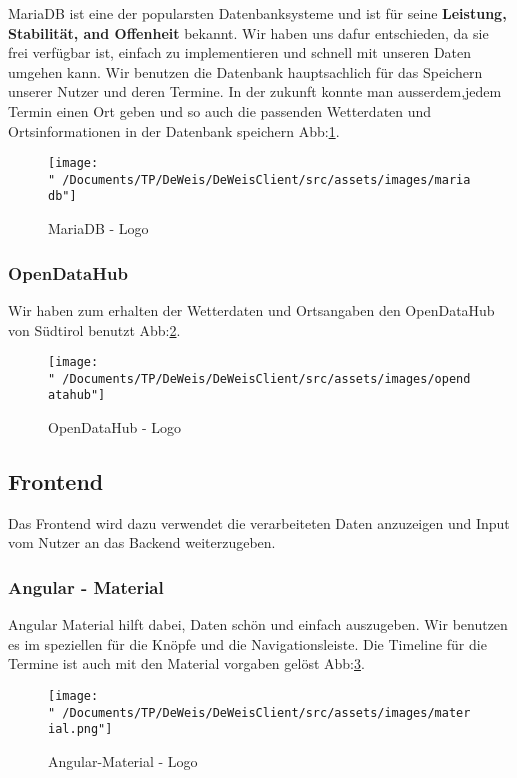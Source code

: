 \documentclass{scrartcl}
\begin{document}
    MariaDB ist eine der popularsten Datenbanksysteme und ist für seine \textbf{Leistung, Stabilität, and Offenheit} bekannt.
    Wir haben uns dafur entschieden, da sie frei verfügbar ist, einfach zu implementieren und schnell mit unseren Daten umgehen kann.
    Wir benutzen die Datenbank hauptsachlich für das Speichern unserer Nutzer und deren Termine. In der zukunft konnte man ausserdem,jedem 
    Termin einen Ort geben und so auch die passenden Wetterdaten und Ortsinformationen in der Datenbank speichern Abb:\ref{fig:maria}.
    \begin{figure}[h]
    \centering
    \texttt{[image: "~/Documents/TP/DeWeis/DeWeisClient/src/assets/images/mariadb"]}
    \caption{MariaDB - Logo}
    \label{fig:maria}
    \end{figure}


    \subsubsection{OpenDataHub}

    Wir haben zum erhalten der Wetterdaten und Ortsangaben den OpenDataHub von Südtirol benutzt Abb:\ref{fig:open}.
    \begin{figure}[h]
    \centering
    \texttt{[image: "~/Documents/TP/DeWeis/DeWeisClient/src/assets/images/opendatahub"]}
    \caption{OpenDataHub - Logo}
    \label{fig:open}
    \end{figure}

    \subsection{Frontend}

    Das Frontend wird dazu verwendet die verarbeiteten Daten anzuzeigen und Input vom Nutzer an das Backend weiterzugeben.

    \subsubsection{Angular - Material}

    Angular Material hilft dabei, Daten schön und einfach auszugeben. Wir benutzen es im speziellen für die Knöpfe 
    und die Navigationsleiste. Die Timeline für die Termine ist auch mit den Material vorgaben gelöst Abb:\ref{fig:mat}.
    \begin{figure}
    \centering
    \texttt{[image: "~/Documents/TP/DeWeis/DeWeisClient/src/assets/images/material.png"]}
    \caption{Angular-Material - Logo}
    \label{fig:mat}
    \end{figure}
\end{document}
